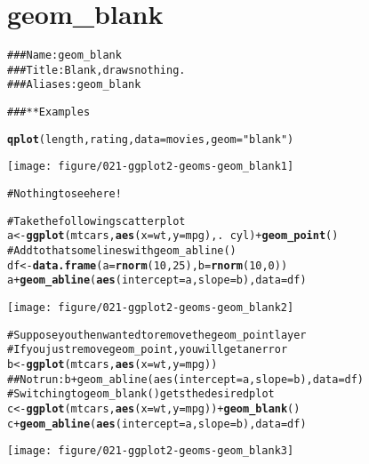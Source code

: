 \documentclass[a4paper,titlepage]{tufte-handout}\usepackage{graphicx, color}
\makeatletter
\def\maxwidth{ %
  \ifdim\Gin@nat@width>\linewidth
    \linewidth
  \else
    \Gin@nat@width
  \fi
}
\newcommand{\hlfunctioncall}[1]{\textcolor[rgb]{0.501960784313725,0,0.329411764705882}{\textbf{#1}}}%
\newcommand{\hlstring}[1]{\textcolor[rgb]{0.6,0.6,1}{#1}}%
\newcommand{\hlcomment}[1]{\textcolor[rgb]{0.180392156862745,0.6,0.341176470588235}{#1}}%
\newenvironment{kframe}{%
 \def\at@end@of@kframe{}%
 \ifinner\ifhmode%
  \def\at@end@of@kframe{\end{minipage}}%
  \begin{minipage}{\columnwidth}%
 \fi\fi%
 \def\FrameCommand##1{\hskip\@totalleftmargin \hskip-\fboxsep
 \colorbox{shadecolor}{##1}\hskip-\fboxsep
     \hskip-\linewidth \hskip-\@totalleftmargin \hskip\columnwidth}%
 \MakeFramed {\advance\hsize-\width
   \@totalleftmargin\z@ \linewidth\hsize
   \@setminipage}}%
 {\par\unskip\endMakeFramed%
 \at@end@of@kframe}
\newenvironment{knitrout}{}{} %
\makeatother
\begin{document}
\section{geom\_blank}

\begin{knitrout}
\color{fgcolor}\begin{kframe}
\begin{alltt}
\hlcomment{### Name: geom_blank}
\hlcomment{### Title: Blank, draws nothing.}
\hlcomment{### Aliases: geom_blank}

\hlcomment{### ** Examples}

\hlfunctioncall{qplot}(length, rating, data = movies, geom = \hlstring{"blank"})
\end{alltt}
\end{kframe}
\texttt{[image: figure/021-ggplot2-geoms-geom\_blank1]} 
\begin{kframe}\begin{alltt}
\hlcomment{# Nothing to see here!}

\hlcomment{# Take the following scatter plot}
a <- \hlfunctioncall{ggplot}(mtcars, \hlfunctioncall{aes}(x = wt, y = mpg), . ~ cyl) + \hlfunctioncall{geom_point}()
\hlcomment{# Add to that some lines with geom_abline()}
df <- \hlfunctioncall{data.frame}(a = \hlfunctioncall{rnorm}(10, 25), b = \hlfunctioncall{rnorm}(10, 0))
a + \hlfunctioncall{geom_abline}(\hlfunctioncall{aes}(intercept = a, slope = b), data = df)
\end{alltt}
\end{kframe}
\texttt{[image: figure/021-ggplot2-geoms-geom\_blank2]} 
\begin{kframe}\begin{alltt}
\hlcomment{# Suppose you then wanted to remove the geom_point layer}
\hlcomment{# If you just remove geom_point, you will get an error}
b <- \hlfunctioncall{ggplot}(mtcars, \hlfunctioncall{aes}(x = wt, y = mpg))
\hlcomment{## Not run: b + geom_abline(aes(intercept = a, slope = b), data = df)}
\hlcomment{# Switching to geom_blank() gets the desired plot}
c <- \hlfunctioncall{ggplot}(mtcars, \hlfunctioncall{aes}(x = wt, y = mpg)) + \hlfunctioncall{geom_blank}()
c + \hlfunctioncall{geom_abline}(\hlfunctioncall{aes}(intercept = a, slope = b), data = df)
\end{alltt}
\end{kframe}
\texttt{[image: figure/021-ggplot2-geoms-geom\_blank3]} 
\begin{kframe}\begin{alltt}


\end{alltt}
\end{kframe}
\end{knitrout}
\end{document}
